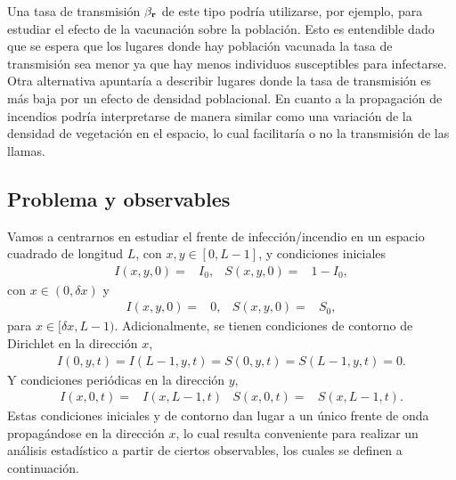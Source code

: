 Una tasa de transmisión $\beta_{\vb{r}}$ de este tipo podría utilizarse, por ejemplo, para estudiar el efecto de la vacunación sobre la población. Esto es 
entendible dado que se espera que los lugares donde hay población vacunada la tasa de transmisión sea menor ya que hay menos individuos susceptibles para
infectarse. Otra alternativa apuntaría a describir lugares donde la tasa de transmisión es más baja por un efecto de densidad poblacional. 
En cuanto a la propagación de incendios podría interpretarse de manera similar como una variación de la densidad de vegetación en el espacio, lo cual 
facilitaría o no la transmisión de las llamas.

\subsection{Problema y observables}
\label{Problema}

Vamos a centrarnos en estudiar el frente de infección/incendio en un espacio cuadrado de longitud $L$, 
con $x,y \in [0,L-1]$, y condiciones iniciales
\begin{align*}
  I(x,y,0)=&I_0, & S(x,y,0)=&1-I_0,
\end{align*}
con $x\in(0,\delta x)$ y 
\begin{align*}
  I(x,y,0)=&0, & S(x,y,0)=&S_0,
\end{align*}
para $x\in[\delta x,L-1)$. Adicionalmente, se tienen condiciones de contorno de Dirichlet en la dirección $x$,
\begin{align*}
  I(0,y,t)=I(L-1,y,t)=S(0,y,t)=S(L-1,y,t)=0. 
\end{align*}
Y condiciones periódicas en la dirección $y$, 
\begin{align*}
  I(x,0,t)=&I(x,L-1,t) & S(x,0,t)=&S(x,L-1,t). 
\end{align*}
Estas condiciones iniciales y de contorno dan lugar a un único frente de onda propagándose en la dirección $x$, lo cual resulta conveniente para realizar un análisis 
estadístico a partir de ciertos observables, los cuales se definen a continuación.

